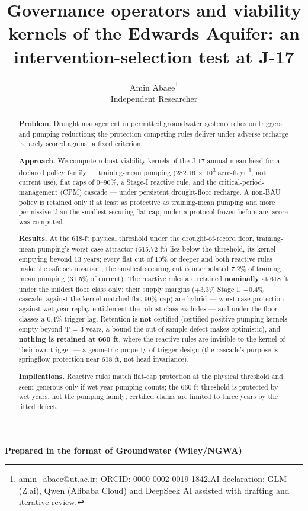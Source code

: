 \documentclass[11pt]{article}
\begin{document}
\title{Governance operators and viability kernels of the Edwards Aquifer: an intervention-selection test at J-17}
\author{Amin Abaee\thanks{amin\_abaee@ut.ac.ir; ORCID: 0000-0002-0019-1842.\newline AI declaration: GLM (Z.ai), Qwen (Alibaba Cloud) and DeepSeek AI assisted with drafting and iterative review.} \\ Independent Researcher}
\date{}
\maketitle

{\centering\small \textbf{Prepared in the format of Groundwater (Wiley/NGWA)}\par}

\begin{abstract}


\textbf{Problem.} Drought management in permitted groundwater systems
relies on triggers and pumping reductions; the protection competing
rules deliver under adverse recharge is rarely scored against a fixed
criterion.

\textbf{Approach.} We compute robust viability kernels of the J-17
annual-mean head for a declared policy family --- training-mean pumping
(282.16 \ensuremath{\times} 10\textsuperscript{3} acre-ft yr\textsuperscript{-1}, not current use), flat caps of 0--90\%, a
Stage-I reactive rule, and the critical-period-management (CPM) cascade
--- under persistent drought-floor recharge. A non-BAU policy is
retained only if at least as protective as training-mean pumping and
more permissive than the smallest securing flat cap, under a protocol
frozen before any score was computed.

\textbf{Results.} At the 618-ft physical threshold under the
drought-of-record floor, training-mean pumping's worst-case attractor
(615.72 ft) lies below the threshold, its kernel emptying beyond 13
years; every flat cut of 10\% or deeper and both reactive rules make the
safe set invariant; the smallest securing cut is interpolated 7.2\% of
training mean pumping (31.5\% of current). The reactive rules are
retained \textbf{nominally} at 618 ft under the mildest floor class
only: their supply margins (+3.3\% Stage I, +0.4\% cascade, against the
kernel-matched flat-90\% cap) are hybrid --- worst-case protection
against wet-year replay entitlement the robust class excludes --- and
under the floor classes a 0.4\% trigger lag. Retention is \textbf{not}
certified (certified positive-pumping kernels empty beyond T = 3 years,
a bound the out-of-sample defect makes optimistic), and \textbf{nothing
is retained at 660 ft}, where the reactive rules are invisible to the
kernel of their own trigger --- a geometric property of trigger design
(the cascade's purpose is springflow protection near 618 ft, not head
invariance).

\textbf{Implications.} Reactive rules match flat-cap protection at the
physical threshold and seem generous only if wet-year pumping counts;
the 660-ft threshold is protected by wet years, not the pumping family;
certified claims are limited to three years by the fitted defect.

\end{abstract}
\end{document}
